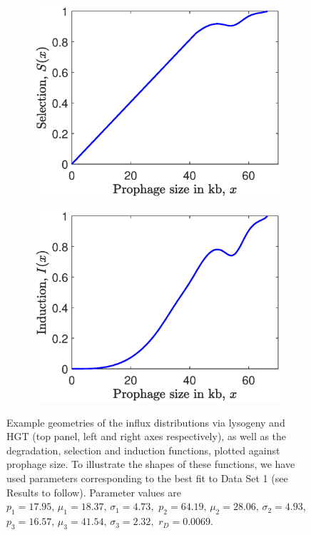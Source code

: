 \begin{figure}[htb!]
\begin{subfigure}[t]{0.5\textwidth}
\end{subfigure} 
\begin{subfigure}[t]{0.5\textwidth}
\centering
\includegraphics[scale=0.5]{sel3.eps}
\subcaption[subfigcapskip = 50pt]{}

\end{subfigure}
\begin{subfigure}[t]{0.5\textwidth}
\includegraphics[scale=0.5]{ind4.eps}
\subcaption[subfigcapskip = 50pt]{}
\end{subfigure}
\caption[Example geometries of the influx distributions via lysogeny and HGT, as well as the degradation, selection and induction functions.]{Example geometries of the influx distributions via lysogeny and HGT (top panel, left and right axes respectively), as well as the degradation, selection and induction functions, plotted against prophage size. To illustrate the shapes of these functions, we have used parameters corresponding to the best fit to Data Set 1 (see Results to follow). Parameter values are $p_{1} = 17.95, \, \mu_{1} = 18.37, \, \sigma_{1} = 4.73,$ $p_{2} = 64.19, \, \mu_{2} = 28.06, \, \sigma_{2} = 4.93$, $p_{3} = 16.57, \, \mu_{3} = 41.54, \, \sigma_{3} = 2.32,$ $r_{D} = 0.0069$. }\label{fig:func}
\end{figure}
